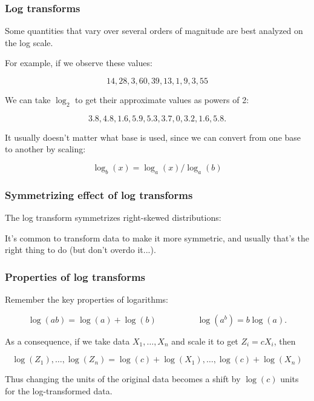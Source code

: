 \begin{frame}
\frametitle{Log transforms}

Some quantities that vary over several orders of magnitude are best
analyzed on the log scale.

For example, if we observe these values:

$$
14,28,3,60,39,13,1,9,3,55
$$

We can take $\log_2$ to get their approximate values as powers of 2:

$$
3.8, 4.8, 1.6, 5.9, 5.3, 3.7, 0, 3.2, 1.6, 5.8.
$$

It usually doesn't matter what base is used, since we can convert from
one base to another by scaling:

$$
\log_b(x) = \log_a(x) / \log_a(b)
$$

\end{frame}

\begin{frame}
\frametitle{Symmetrizing effect of log transforms}

The log transform symmetrizes right-skewed distributions:


It's common to transform data to make it more symmetric, and usually
that's the right thing to do (but don't overdo it...).


\end{frame}

\begin{frame}
\frametitle{Properties of log transforms}

Remember the key properties of logarithms: 

$$\log(ab) = \log(a) + \log(b) \hspace{2cm} \log(a^b) = b\log(a).$$

As a consequence, if we take data $X_1, \ldots, X_n$ and scale it to
get $Z_i = cX_i$, then

$$
\log(Z_1), \ldots, \log(Z_n) = \log(c)+\log(X_1), \ldots, \log(c)+\log(X_n)
$$

Thus changing the units of the original data becomes a shift by
$\log(c)$ units for the log-transformed data.

\end{frame}

